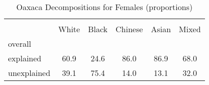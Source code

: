 \begin{table}[htbp]\centering
\caption{Oaxaca Decompositions for Females (proportions)}
\begin{tabular}{l*{5}{c}}
\hline\hline
          &         &         &         &         &         \\
          &    White&    Black&  Chinese&    Asian&    Mixed\\
\hline
overall   &         &         &         &         &         \\
explained &     60.9&     24.6&     86.0&     86.9&     68.0\\
unexplained&     39.1&     75.4&     14.0&     13.1&     32.0\\
\hline\hline
\end{tabular}
\end{table}
